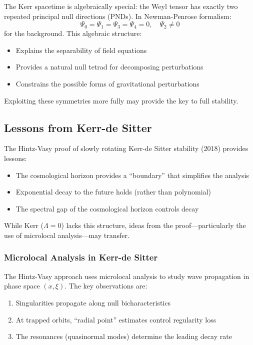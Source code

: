 \documentclass[12pt,a4paper]{article}
\begin{document}
The Kerr spacetime is algebraically special: the Weyl tensor has exactly two repeated principal null directions (PNDs). In Newman-Penrose formalism:
\begin{equation}
\Psi_0 = \Psi_1 = \Psi_3 = \Psi_4 = 0, \quad \Psi_2 \neq 0
\end{equation}
for the background. This algebraic structure:
\begin{itemize}
    \item Explains the separability of field equations
    \item Provides a natural null tetrad for decomposing perturbations
    \item Constrains the possible forms of gravitational perturbations
\end{itemize}

Exploiting these symmetries more fully may provide the key to full stability.

\subsection{Lessons from Kerr-de Sitter}

The Hintz-Vasy proof of slowly rotating Kerr-de Sitter stability (2018) provides lessons:
\begin{itemize}
    \item The cosmological horizon provides a ``boundary'' that simplifies the analysis
    \item Exponential decay to the future holds (rather than polynomial)
    \item The spectral gap of the cosmological horizon controls decay
\end{itemize}

While Kerr ($\Lambda = 0$) lacks this structure, ideas from the proof---particularly the use of microlocal analysis---may transfer.

\subsubsection{Microlocal Analysis in Kerr-de Sitter}

The Hintz-Vasy approach uses microlocal analysis to study wave propagation in phase space $(x, \xi)$. The key observations are:
\begin{enumerate}
    \item Singularities propagate along null bicharacteristics
    \item At trapped orbits, ``radial point'' estimates control regularity loss
    \item The resonances (quasinormal modes) determine the leading decay rate
\end{enumerate}
\end{document}
